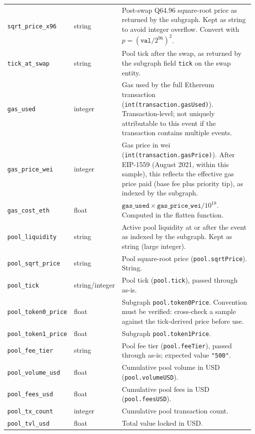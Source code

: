 \documentclass[11pt,a4paper]{article}
\begin{document}
\begin{xltabular}{\linewidth}{L{4.5cm}L{3.0cm}Y}
\texttt{sqrt\_price\_x96} & string & Post-swap Q64.96 square-root price
  as returned by the subgraph. Kept as string to avoid integer overflow.
  Convert with $p = (\texttt{val}/2^{96})^{2}$. \\
\texttt{tick\_at\_swap} & string & Pool tick after the swap, as returned
  by the subgraph field \texttt{tick} on the swap entity. \\
\texttt{gas\_used} & integer & Gas used by the full Ethereum transaction
  (\texttt{int(transaction.gasUsed)}). Transaction-level; not uniquely
  attributable to this event if the transaction contains multiple events. \\
\texttt{gas\_price\_wei} & integer & Gas price in wei
  (\texttt{int(transaction.gasPrice)}). After EIP-1559 (August 2021, within
  this sample), this reflects the effective gas price paid (base fee plus
  priority tip), as indexed by the subgraph. \\
\texttt{gas\_cost\_eth} & float & $\texttt{gas\_used} \times
  \texttt{gas\_price\_wei} / 10^{18}$. Computed in the flatten function. \\
\texttt{pool\_liquidity} & string & Active pool liquidity at or after the
  event as indexed by the subgraph. Kept as string (large integer). \\
\texttt{pool\_sqrt\_price} & string & Pool square-root price
  (\texttt{pool.sqrtPrice}). String. \\
\texttt{pool\_tick} & string/integer & Pool tick (\texttt{pool.tick}),
  passed through as-is. \\
\texttt{pool\_token0\_price} & float & Subgraph \texttt{pool.token0Price}.
  Convention must be verified: cross-check a sample against the tick-derived
  price before use. \\
\texttt{pool\_token1\_price} & float & Subgraph \texttt{pool.token1Price}. \\
\texttt{pool\_fee\_tier} & string & Pool fee tier (\texttt{pool.feeTier}),
  passed through as-is; expected value \texttt{"500"}. \\
\texttt{pool\_volume\_usd} & float & Cumulative pool volume in USD
  (\texttt{pool.volumeUSD}). \\
\texttt{pool\_fees\_usd} & float & Cumulative pool fees in USD
  (\texttt{pool.feesUSD}). \\
\texttt{pool\_tx\_count} & integer & Cumulative pool transaction count. \\
\texttt{pool\_tvl\_usd} & float & Total value locked in USD. \\

\end{xltabular}
\end{document}
